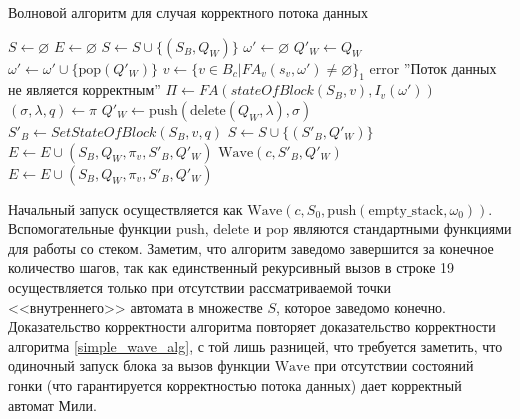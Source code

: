 \documentclass[10pt,a4paper]{article}
\newcommand{\FA}{F\!A}
\begin{document}
  \begin{algorithm}
    \caption{Волновой алгоритм для случая корректного потока данных}
    \label{wave_alg}
    \begin{algorithmic}[1]
      \State $S \leftarrow \varnothing$
      \State $E \leftarrow \varnothing$
         \State $S \leftarrow S \cup \{(S_B, Q_W)\}$
         \State $\omega' \leftarrow \varnothing$
         \State $Q'_W \leftarrow Q_W$
         \While{$\forall v \in B_c : \FA_v(s_v, \omega') = \varnothing \vee \neg \zeta(\sigma, \omega)$}
           \State $\omega' \leftarrow \omega' \cup \{\text{pop}(Q'_W)\}$
         \EndWhile
         \Statex
         \If{$\lvert \{v \in B_c \vert \FA_v(s_v, \omega') \neq \varnothing \} \rvert = 1$}
           \State $v \leftarrow \{v \in B_c \vert \FA_v(s_v, \omega') \neq \varnothing \}_1$
         \Else
           \State error ''Поток данных не является корректным''
         \EndIf
         \State $\Pi \leftarrow \FA(stateOfBlock(S_B, v), I_v(\omega'))$
           \State $(\sigma, \lambda, q) \leftarrow \pi$
           \State $Q'_W \leftarrow \text{push}(\text{delete}(Q_W, \lambda), \sigma)$
           \State $S'_B \leftarrow SetStateOfBlock(S_B, v, q)$
             \State $S \leftarrow S \cup \{(S'_B, Q'_W)\}$
             \State $E \leftarrow E \cup (S_B, Q_W, \pi_v, S'_B, Q'_W)$
             \State $\text{Wave}(c, S'_B, Q'_W)$
          \Else
             \State $E \leftarrow E \cup (S_B, Q_W, \pi_v, S'_B, Q'_W)$
          \EndIf
         \EndFor
      \EndFunction
    \end{algorithmic}
  \end{algorithm}
  
  Начальный запуск осуществляется как $\text{Wave}(c, S_0, \text{push}(\text{empty\_stack}, \omega_0))$.
  Вспомогательные функции $\text{push}$, $\text{delete}$ и $\text{pop}$ являются стандартными функциями для работы со стеком.
  Заметим, что алгоритм заведомо завершится за конечное количество шагов, так как единственный рекурсивный вызов в строке 19 осуществляется только при отсутствии рассматриваемой
  точки <<внутреннего>> автомата в множестве $S$, которое заведомо конечно. Доказательство корректности алгоритма повторяет доказательство
  корректности алгоритма \ref{simple_wave_alg}, с той лишь разницей, что требуется заметить, что одиночный запуск блока за вызов функции $\text{Wave}$ при отсутствии
  состояний гонки (что гарантируется корректностью потока данных) дает корректный автомат Мили.
  
\end{document}
